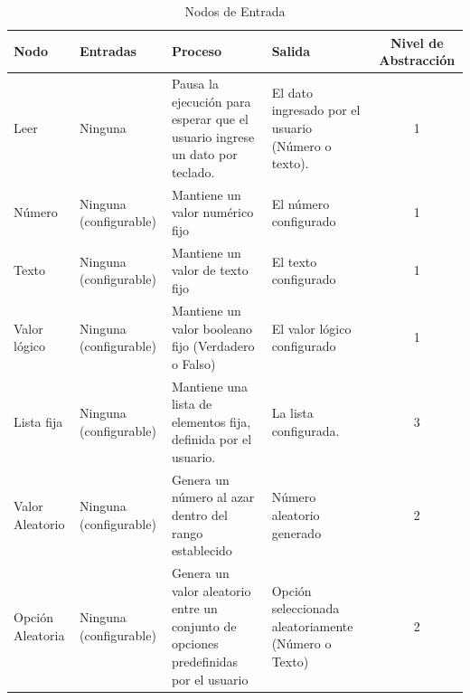 \label{apx:node-catalog}

\begingroup
\renewcommand{\TableBodyFontSize}{\scriptsize}

\begin{table}[H]
    \centering
    \caption{Nodos de Entrada}
    \begin{tabularx}{\textwidth}{ l X X X c }
        \hline
        \textbf{Nodo}    & \textbf{Entradas}                 & \textbf{Proceso}                                                                     & \textbf{Salida}                                     & \textbf{Nivel de Abstracción} \\ \hline
        Leer             & Ninguna                           & Pausa la ejecución para esperar que el usuario ingrese un dato por teclado.          & El dato ingresado por el usuario (Número o texto).  & 1                             \\
        Número           & Ninguna (configurable)            & Mantiene un valor numérico fijo                                                      & El número configurado                               & 1                             \\
        Texto            & Ninguna (configurable)            & Mantiene un valor de texto fijo                                                      & El texto configurado                                & 1                             \\
        Valor lógico     & Ninguna (configurable)            & Mantiene un valor booleano fijo (Verdadero o Falso)                                  & El valor lógico configurado                         & 1                             \\
        Lista fija       & Ninguna (configurable)            & Mantiene una lista de elementos fija, definida por el usuario.                       & La lista configurada.                               & 3                             \\
        Valor Aleatorio  & Ninguna (configurable)            & Genera un número al azar dentro del rango establecido                                & Número aleatorio generado                           & 2                             \\
        Opción Aleatoria & Ninguna (configurable)            & Genera un valor aleatorio entre un conjunto de opciones predefinidas por el usuario  & Opción seleccionada aleatoriamente (Número o Texto) & 2                             \\

\end{tabularx}
\end{table}
